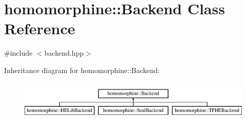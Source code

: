 \hypertarget{classhomomorphine_1_1_backend}{}\section{homomorphine\+::Backend Class Reference}
\label{classhomomorphine_1_1_backend}


{\ttfamily \#include $<$backend.\+hpp$>$}

Inheritance diagram for homomorphine\+::Backend\+:\begin{figure}[H]
\begin{center}
\leavevmode
\includegraphics[height=1.954625cm]{classhomomorphine_1_1_backend}
\end{center}
\end{figure}

